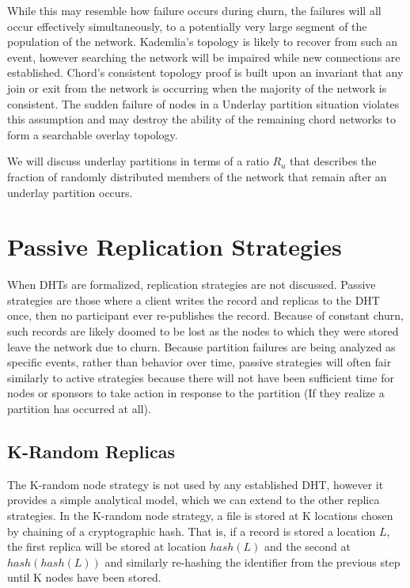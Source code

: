 While this may resemble how failure occurs during churn, the failures will all occur effectively simultaneously, to a potentially very large segment of the population of the network.
Kademlia's topology is likely to recover from such an event, however searching the network will be impaired while new connections are established.
Chord's consistent topology proof is built upon an invariant that any join or exit from the network is occurring when the majority of the network is consistent. 
The sudden failure of nodes in a Underlay partition situation violates this assumption and may destroy the ability of the remaining chord networks to form a searchable overlay topology.

We will discuss underlay partitions in terms of a ratio $R_{u}$ that describes the fraction of randomly distributed members of the network that remain after an underlay partition occurs. 

\section{Passive Replication Strategies}

When DHTs are formalized\cite{chord}\cite{kademlia}, replication strategies are not discussed.
Passive strategies are those where a client writes the record and replicas to the DHT once, then no participant ever re-publishes the record.
Because of constant churn, such records are likely doomed to be lost as the nodes to which they were stored leave the network due to churn.
Because partition failures are being analyzed as specific events, rather than behavior over time, passive strategies will often fair similarly to active strategies because there will not have been sufficient time for nodes or sponsors to take action in response to the partition (If they realize a partition has occurred at all).

\subsection{K-Random Replicas}
The K-random node strategy is not used by any established DHT, however it provides a simple analytical model, which we can extend to the other replica strategies.
In the K-random node strategy, a file is stored at K locations chosen by chaining of a cryptographic hash.
That is, if a record is stored a location $L$, the first replica will be stored at location $hash(L)$ and the second at $hash(hash(L))$ and similarly re-hashing the identifier from the previous step until K nodes have been stored.


